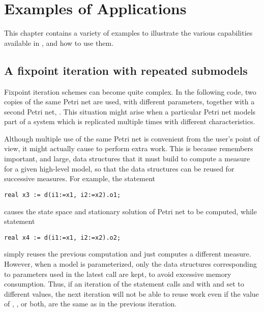 %
%

\chapter{Examples of {\smart} Applications} \label{SEC:Examples}

This chapter contains a variety of examples to illustrate the various
capabilities available in {\smart}, and how to use them.

\section{A fixpoint iteration with repeated submodels}

Fixpoint iteration schemes can become quite complex.
In the following code, two copies of the same Petri net  are used,
with different parameters, together with a second Petri net, .
This situation might arise when a particular Petri net models part of a system
which is replicated multiple times with different characteristics.
%

%
Although multiple use of the same Petri net is convenient from the
user's point of view, it might actually cause {\smart} to perform extra work.
This is because {\smart} remembers important, and large, data structures
that it must build to compute a measure for a given high-level model,
so that the data structures can be reused for successive measures.
For example, the statement
\begin{lstlisting}
real x3 := d(i1:=x1, i2:=x2).o1;
\end{lstlisting}
causes the state space and stationary solution of Petri net 
to be computed, while statement
\begin{lstlisting}
real x4 := d(i1:=x1, i2:=x2).o2;
\end{lstlisting}
simply reuses the previous computation and just computes a different measure.
However, when a model is parameterized, only the data structures
corresponding to parameters used in the latest call are kept,
to avoid excessive memory consumption.
Thus, if an iteration of the  statement
calls  and  with  and
 set to different values, the next iteration will
not be able to reuse work even if the value of , ,
or both, are the same as in the previous iteration.

